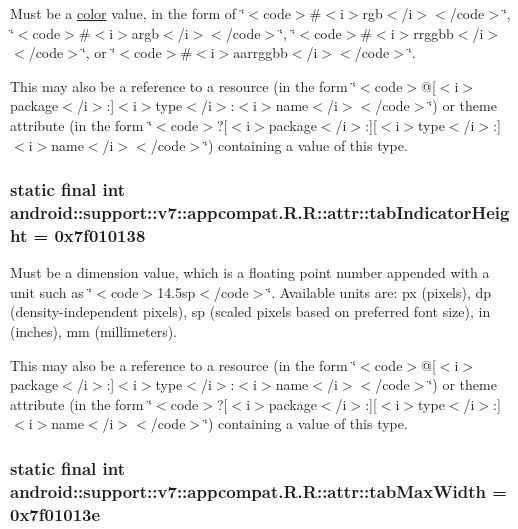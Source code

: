Must be a \hyperlink{classandroid_1_1support_1_1v7_1_1appcompat_1_1_r_1_1color}{color} value, in the form of \char`\"{}$<$code$>$\#$<$i$>$rgb$<$/i$>$$<$/code$>$\char`\"{}, \char`\"{}$<$code$>$\#$<$i$>$argb$<$/i$>$$<$/code$>$\char`\"{}, \char`\"{}$<$code$>$\#$<$i$>$rrggbb$<$/i$>$$<$/code$>$\char`\"{}, or \char`\"{}$<$code$>$\#$<$i$>$aarrggbb$<$/i$>$$<$/code$>$\char`\"{}. 

This may also be a reference to a resource (in the form \char`\"{}$<$code$>$@\mbox{[}$<$i$>$package$<$/i$>$:\mbox{]}$<$i$>$type$<$/i$>$:$<$i$>$name$<$/i$>$$<$/code$>$\char`\"{}) or theme attribute (in the form \char`\"{}$<$code$>$?\mbox{[}$<$i$>$package$<$/i$>$:\mbox{]}\mbox{[}$<$i$>$type$<$/i$>$:\mbox{]}$<$i$>$name$<$/i$>$$<$/code$>$\char`\"{}) containing a value of this type. \hypertarget{classandroid_1_1support_1_1v7_1_1appcompat_1_1_r_1_1attr_dd1eb1d471ed824e2a2457d2b651437d}{
\subsubsection[{tabIndicatorHeight}]{\setlength{\rightskip}{0pt plus 5cm}static final int android::support::v7::appcompat.R.R::attr::tabIndicatorHeight = 0x7f010138}}
\label{classandroid_1_1support_1_1v7_1_1appcompat_1_1_r_1_1attr_dd1eb1d471ed824e2a2457d2b651437d}


Must be a dimension value, which is a floating point number appended with a unit such as \char`\"{}$<$code$>$14.5sp$<$/code$>$\char`\"{}. Available units are: px (pixels), dp (density-independent pixels), sp (scaled pixels based on preferred font size), in (inches), mm (millimeters). 

This may also be a reference to a resource (in the form \char`\"{}$<$code$>$@\mbox{[}$<$i$>$package$<$/i$>$:\mbox{]}$<$i$>$type$<$/i$>$:$<$i$>$name$<$/i$>$$<$/code$>$\char`\"{}) or theme attribute (in the form \char`\"{}$<$code$>$?\mbox{[}$<$i$>$package$<$/i$>$:\mbox{]}\mbox{[}$<$i$>$type$<$/i$>$:\mbox{]}$<$i$>$name$<$/i$>$$<$/code$>$\char`\"{}) containing a value of this type. \hypertarget{classandroid_1_1support_1_1v7_1_1appcompat_1_1_r_1_1attr_bed8f2120136daed0d3ca4c6ca6f8fee}{
\subsubsection[{tabMaxWidth}]{\setlength{\rightskip}{0pt plus 5cm}static final int android::support::v7::appcompat.R.R::attr::tabMaxWidth = 0x7f01013e}}
\label{classandroid_1_1support_1_1v7_1_1appcompat_1_1_r_1_1attr_bed8f2120136daed0d3ca4c6ca6f8fee}


